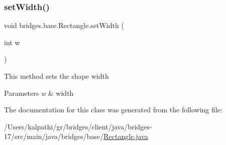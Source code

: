 \mbox{\label{classbridges_1_1base_1_1_rectangle_a803ca26bb6bb0c29c9316d910fce0fe1}} 
\subsubsection{\texorpdfstring{set\+Width()}{setWidth()}}
{\footnotesize\ttfamily void bridges.\+base.\+Rectangle.\+set\+Width (\begin{DoxyParamCaption}\item[{int}]{w }\end{DoxyParamCaption})}

This method sets the shape width


\begin{DoxyParams}{Parameters}
{\em w} & width \\
\hline
\end{DoxyParams}


The documentation for this class was generated from the following file\+:\begin{DoxyCompactItemize}
\item 
/\+Users/kalpathi/gr/bridges/client/java/bridges-\/17/src/main/java/bridges/base/\mbox{\hyperlink{_rectangle_8java}{Rectangle.\+java}}\end{DoxyCompactItemize}
